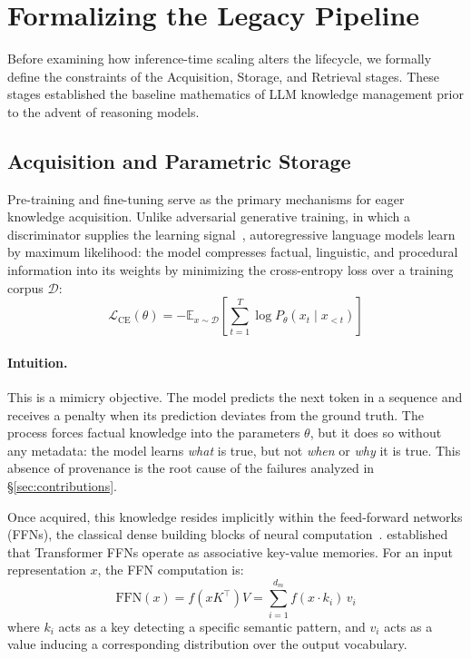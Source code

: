 \documentclass{article}
\begin{document}
\section{Formalizing the Legacy Pipeline}
\label{sec:legacy_pipeline}
\label{sec:retrieval}

Before examining how inference-time scaling alters the lifecycle, we formally define the constraints of the Acquisition, Storage, and Retrieval stages. These stages established the baseline mathematics of LLM knowledge management prior to the advent of reasoning models.

\subsection{Acquisition and Parametric Storage}
\label{sec:acquisition}
\label{sec:storage}

Pre-training and fine-tuning serve as the primary mechanisms for eager knowledge acquisition. Unlike adversarial generative training, in which a discriminator supplies the learning signal~\citep{thakur2021gan}, autoregressive language models learn by maximum likelihood: the model compresses factual, linguistic, and procedural information into its weights by minimizing the cross-entropy loss over a training corpus $\mathcal{D}$:
\begin{equation}
  \label{eq:ce}
  \mathcal{L}_{\text{CE}}(\theta) = -\mathbb{E}_{x \sim \mathcal{D}} \left[ \sum_{t=1}^T \log P_\theta(x_t \mid x_{<t}) \right]
\end{equation}

\paragraph{Intuition.} This is a mimicry objective. The model predicts the next token in a sequence and receives a penalty when its prediction deviates from the ground truth. The process forces factual knowledge into the parameters $\theta$, but it does so without any metadata: the model learns \textit{what} is true, but not \textit{when} or \textit{why} it is true. This absence of provenance is the root cause of the failures analyzed in \S\ref{sec:contributions}.

Once acquired, this knowledge resides implicitly within the feed-forward networks (FFNs), the classical dense building blocks of neural computation~\citep{thakur2021fundamentals}. \citet{geva2021kv} established that Transformer FFNs operate as associative key-value memories. For an input representation $x$, the FFN computation is:
\begin{equation}
  \label{eq:ffn}
  \text{FFN}(x) = f(x K^\top)V = \sum_{i=1}^{d_m} f(x \cdot k_i)\, v_i
\end{equation}
where $k_i$ acts as a key detecting a specific semantic pattern, and $v_i$ acts as a value inducing a corresponding distribution over the output vocabulary.
\end{document}
